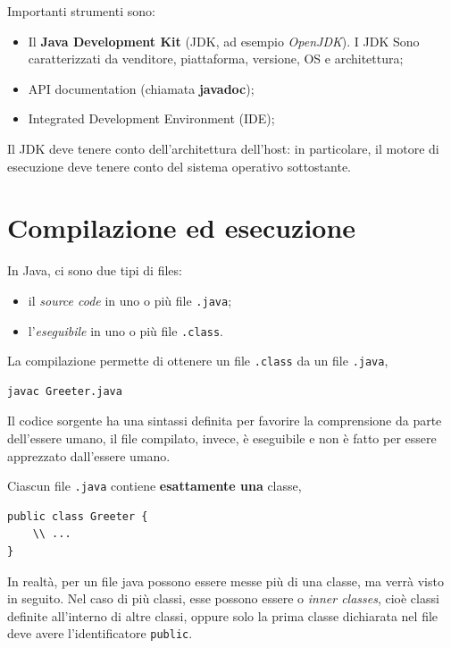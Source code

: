\documentclass[\fontsizeclass,twocolumn]{\classname}
\let\oldtextsc\textsc
\renewcommand{\textsc}[1]{\oldtextsc{\scfontfs #1}}
\theoremstyle{definition}
\theoremstyle{definition}
\begin{document}
Importanti strumenti sono:

\begin{itemize}
    \item Il \textbf{Java Development Kit} (JDK, ad esempio \emph{OpenJDK}).
        I JDK Sono caratterizzati da venditore, piattaforma, versione, OS e
        architettura;
	\item API documentation (chiamata \textbf{javadoc});
	\item Integrated Development Environment (\textsc{IDE});
\end{itemize}

Il JDK deve tenere conto dell'architettura dell'host: in particolare, il motore
di esecuzione deve tenere conto del sistema operativo sottostante.

\section{Compilazione ed esecuzione}

In Java, ci sono due tipi di files:

\begin{itemize}
	\item il \emph{source code} in uno o più file \texttt{.java};
	\item l'\emph{eseguibile} in uno o più file \texttt{.class}.
\end{itemize}

La compilazione permette di ottenere un file \texttt{.class} da un file
\texttt{.java},


\begin{lstlisting}
javac Greeter.java
\end{lstlisting}

Il codice sorgente ha una sintassi definita per favorire la comprensione da
parte dell'essere umano, il file compilato, invece, è eseguibile e non è fatto
per essere apprezzato dall'essere umano.

Ciascun file \texttt{.java} contiene \textbf{esattamente una} classe,

\begin{lstlisting}
public class Greeter {
	\\ ...
}
\end{lstlisting}

In realtà, per un file java possono essere messe più di una classe, ma verrà
visto in seguito. Nel caso di più classi, esse possono essere o \emph{inner
classes}, cioè classi definite all'interno di altre classi, oppure solo la
prima classe dichiarata nel file deve avere l'identificatore \texttt{public}.
\end{document}
